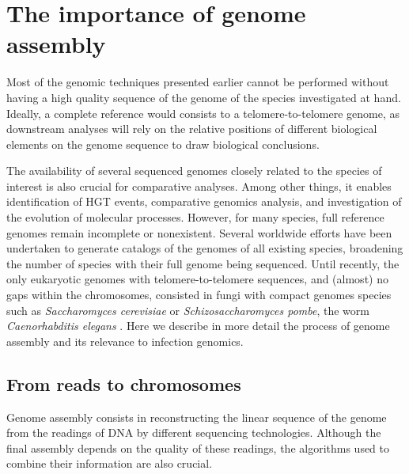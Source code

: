 

\chapter{The importance of genome assembly} %

\label{ch:01-03} %

Most of the genomic techniques presented earlier cannot be performed without having a high quality sequence of the genome of the species investigated at hand. Ideally, a complete reference would consists to a telomere-to-telomere genome, as downstream analyses will rely on the relative positions of different biological elements on the genome sequence to draw biological conclusions. 

The availability of several sequenced genomes closely related to the species of interest is also crucial for comparative analyses. Among other things, it enables identification of \acrshort{HGT} events, comparative genomics analysis, and investigation of the evolution of molecular processes. However, for many species, full reference genomes remain incomplete or nonexistent. Several worldwide efforts have been undertaken to generate catalogs of the genomes of all existing species, broadening the number of species with their full genome being sequenced. Until recently, the only eukaryotic genomes with telomere-to-telomere sequences, and (almost) no gaps within the chromosomes, consisted in fungi with compact genomes species such as \textit{Saccharomyces cerevisiae} or \textit{Schizosaccharomyces pombe}, the worm \textit{Caenorhabditis elegans} \cite{yoshimuraRecompletingCaenorhabditisElegans2019,mewesOverviewYeastGenome1997}. Here we describe in more detail the process of genome assembly and its relevance to infection genomics.

\section{From reads to chromosomes}

Genome assembly consists in reconstructing the linear sequence of the genome from the readings of DNA by different sequencing technologies. Although the final assembly depends on the quality of these readings, the algorithms used to combine their information are also crucial.

